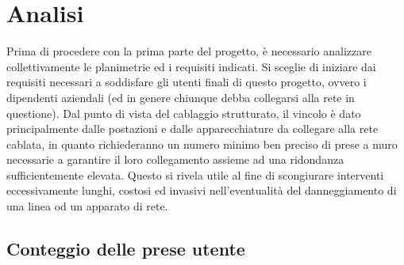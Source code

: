 %

\section{Analisi}
Prima di procedere con la prima parte del progetto, è necessario analizzare collettivamente
le planimetrie ed i requisiti indicati. Si sceglie di iniziare dai requisiti necessari a soddisfare
gli utenti finali di questo progetto, ovvero i dipendenti aziendali (ed in genere chiunque debba collegarsi
alla rete in questione). Dal punto di vista del cablaggio strutturato, il vincolo è dato principalmente dalle
postazioni e dalle apparecchiature da collegare alla rete cablata, in quanto richiederanno un numero minimo
ben preciso di prese a muro necessarie a garantire il loro collegamento assieme ad una ridondanza
sufficientemente elevata. Questo si rivela utile al fine di scongiurare interventi eccessivamente lunghi,
costosi ed invasivi nell'eventualità del danneggiamento di una linea od un apparato di rete.

\subsection{Conteggio delle prese utente}